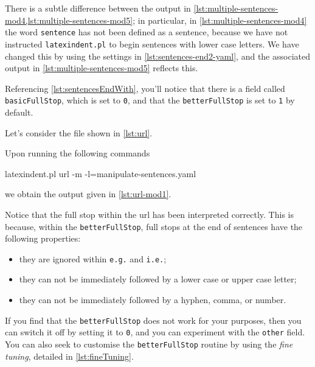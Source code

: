 	There is a subtle difference between the output in
	\cref{lst:multiple-sentences-mod4,lst:multiple-sentences-mod5}; in particular, in
	\cref{lst:multiple-sentences-mod4} the word \texttt{sentence} has not been defined as a
	sentence, because we have not instructed \texttt{latexindent.pl} to begin sentences with
	lower case letters. We have changed this by using the settings in
	\cref{lst:sentences-end2-yaml}, and the associated output in
	\cref{lst:multiple-sentences-mod5} reflects this.

	Referencing \vref{lst:sentencesEndWith}, you'll notice that there is a field called
	\texttt{basicFullStop}, which is set to \texttt{0}, and that the \texttt{betterFullStop}
	is set to \texttt{1} by default.

	Let's consider the file shown in \cref{lst:url}.


	Upon running the following commands  
	\begin{commandshell}
latexindent.pl url -m -l=manipulate-sentences.yaml
\end{commandshell}
	we obtain the output given in \cref{lst:url-mod1}.


	Notice that the full stop within the url has been interpreted correctly. This is because,
	within the \texttt{betterFullStop}, full stops at the end of sentences have the following
	properties:
	\begin{itemize}
		\item they are ignored within \texttt{e.g.} and \texttt{i.e.};
		\item they can not be immediately followed by a lower case or upper case letter;
		\item they can not be immediately followed by a hyphen, comma, or number.
	\end{itemize}
	If you find that the \texttt{betterFullStop} does not work for your purposes, then you
	can switch it off by setting it to \texttt{0}, and you can experiment with the
	\texttt{other} field.%
	 You can also seek to customise the \texttt{betterFullStop}
	routine by using the \emph{fine tuning}, detailed in \vref{lst:fineTuning}.

